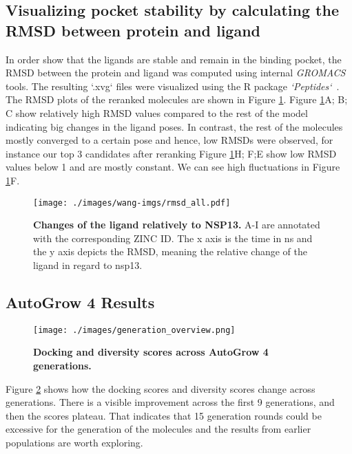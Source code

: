 \documentclass[11pt, letterpaper, titlepage]{article}
\begin{document}
 

\subsection{Visualizing pocket stability by calculating the RMSD between protein and ligand} 

 

In order show that the ligands are stable and remain in the binding pocket, the RMSD between the protein and ligand was computed using internal \emph{GROMACS} tools. The resulting `.xvg` files were visualized using the R package \emph{`Peptides`}~\cite{Osrio2015PeptidesAP}. The RMSD plots of the reranked molecules are shown in Figure \ref{fig:rmsd}. Figure \ref{fig:rmsd}A; B; C show relatively high RMSD values compared to the rest of the model indicating big changes in the ligand poses. In contrast, the rest of the molecules mostly converged to a certain pose and hence, low RMSDs were observed, for instance our top 3 candidates after reranking Figure \ref{fig:rmsd}H; F;E show low RMSD values below 1 and are mostly constant. We can see high fluctuations in Figure \ref{fig:rmsd}F. 

 
\FloatBarrier
\begin{figure}[h!]

\centering

\texttt{[image: ./images/wang-imgs/rmsd\_all.pdf]} 

\caption{\textbf{Changes of the ligand relatively to NSP13.} A-I are annotated with the corresponding ZINC ID. The x axis is the time in ns and the y axis depicts the RMSD, meaning the relative change of the ligand in regard to nsp13.} 

\label{fig:rmsd} 

\end{figure} 
\FloatBarrier

\subsection{AutoGrow 4 Results}
\begin{figure}[h!]

\centering

\texttt{[image: ./images/generation\_overview.png]} 

\caption{\textbf{Docking and diversity scores across AutoGrow 4 generations.}} 

\label{fig:dockdiv} 

\end{figure} 
\noindent Figure \ref{fig:dockdiv} shows how the docking scores and diversity scores change across generations. There is a visible improvement across the first 9 generations, and then the scores plateau. That indicates that 15 generation rounds could be excessive for the generation of the molecules and the results from earlier populations are worth exploring.
\end{document}
